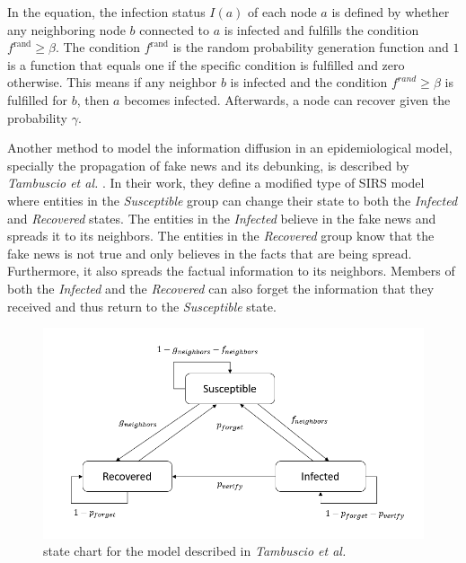 In the equation, the infection status $I(a)$ of each node $a$ is defined 
by whether any neighboring node $b$ connected to $a$ is infected 
and fulfills the condition $f^{\mathrm{rand}}\geq \beta$.
The condition $f^{\mathrm{rand}}$ is the random probability generation function and $1$ 
is a function that equals one if the specific condition is fulfilled and 
zero otherwise. This means if any neighbor $b$ is infected and the 
condition $f^{rand}\geq \beta$ is fulfilled for $b$, then $a$ becomes infected. 
Afterwards, a node can recover given the probability $\gamma$.

Another method to model the information diffusion in an epidemiological model, 
specially the propagation of fake news and its debunking,
is described by \textit{Tambuscio et al.} \cite{sirsmodel}. In their work, they
define a modified type of SIRS model where entities in the \textit{Susceptible}
group can change their state to both the \textit{Infected} and
\textit{Recovered} states.
The entities in the \textit{Infected} believe in the fake news and spreads it 
to its neighbors.
The entities in the \textit{Recovered} group know that the fake news is not 
true and only believes in the facts that are being spread. Furthermore, it
also spreads the factual information to its neighbors.
Members of both the \textit{Infected} and the \textit{Recovered} can also forget
the information that they received and thus return to the \textit{Susceptible} state.

\begin{figure}[!ht]
    \center
    \includegraphics[scale=.9]{figs/Tambuscio.png}
    \caption{state chart for the model described
    in \textit{Tambuscio et al.} \cite{sirsmodel}}
    \label{originalmodelstatechart}
\end{figure}

